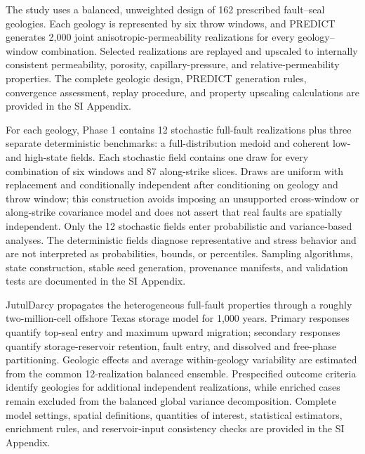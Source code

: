 
The study uses a balanced, unweighted design of 162 prescribed fault--seal
geologies. Each geology is represented by six throw windows, and PREDICT
generates 2,000 joint anisotropic-permeability realizations for every
geology--window combination. Selected realizations are replayed and upscaled
to internally consistent permeability, porosity, capillary-pressure, and
relative-permeability properties. The complete geologic design, PREDICT
generation rules, convergence assessment, replay procedure, and property
upscaling calculations are provided in the SI Appendix.

For each geology, Phase 1 contains 12 stochastic full-fault realizations plus
three separate deterministic benchmarks: a full-distribution medoid and
coherent low- and high-state fields. Each stochastic field contains one draw
for every combination of six windows and 87 along-strike slices. Draws are
uniform with replacement and conditionally independent after conditioning on
geology and throw window; this construction avoids imposing an unsupported
cross-window or along-strike covariance model and does not assert that real
faults are spatially independent. Only the 12 stochastic fields enter
probabilistic and variance-based analyses. The deterministic fields diagnose
representative and stress behavior and are not interpreted as probabilities,
bounds, or percentiles. Sampling algorithms, state construction, stable seed
generation, provenance manifests, and validation tests are documented in the
SI Appendix.

JutulDarcy propagates the heterogeneous full-fault properties through a
roughly two-million-cell offshore Texas storage model for 1,000 years. Primary
responses quantify top-seal entry and maximum upward migration; secondary
responses quantify storage-reservoir retention, fault entry, and dissolved
and free-phase partitioning. Geologic effects and average within-geology
variability are estimated from the common 12-realization balanced ensemble.
Prespecified outcome criteria identify geologies for additional independent
realizations, while enriched cases remain excluded from the balanced global
variance decomposition. Complete model settings, spatial definitions,
quantities of interest, statistical estimators, enrichment rules, and
reservoir-input consistency checks are provided in the SI Appendix.
